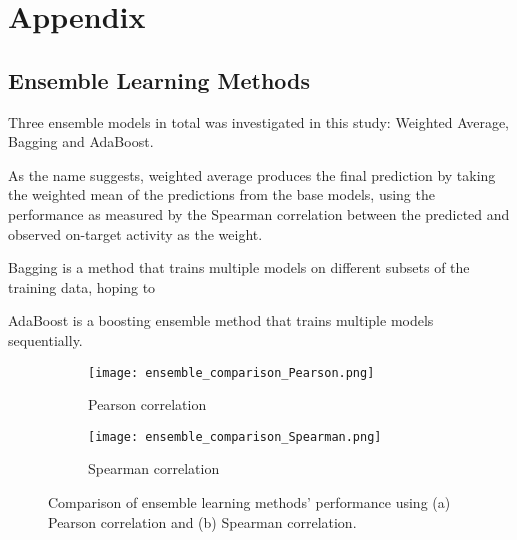\section{Appendix}

\subsection{Ensemble Learning Methods}
\label{appendix:ensemble}

Three ensemble models in total was investigated in this study: Weighted Average, Bagging and AdaBoost. 

As the name suggests, weighted average produces the final prediction by taking the weighted mean of the predictions from the base models, using the performance as measured by the Spearman correlation between the predicted and observed on-target activity as the weight. 

Bagging is a method that trains multiple models on different subsets of the training data, hoping to 

AdaBoost is a boosting ensemble method that trains multiple models sequentially. 

\begin{figure}[h]
    \centering
    \begin{subfigure}{0.4\textwidth}
        \centering
        \texttt{[image: ensemble\_comparison\_Pearson.png]}
        \caption{Pearson correlation}
    \end{subfigure}
    \begin{subfigure}{0.4\textwidth}
        \centering
        \texttt{[image: ensemble\_comparison\_Spearman.png]}
        \caption{Spearman correlation}
    \end{subfigure}
    \caption{Comparison of ensemble learning methods' performance using (a) Pearson correlation and (b) Spearman correlation.}
    \label{fig:ensemble_comparison}
\end{figure}